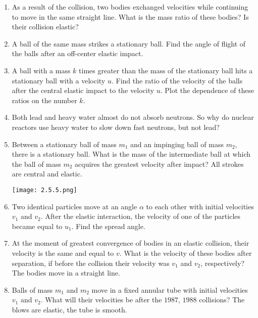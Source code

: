 \documentclass{article}
\begin{document}
\begin{enumerate}[label=2.5.\arabic*]

\item As a result of the collision, two bodies exchanged velocities while continuing to move in the same straight line. What is the mass ratio of these bodies? Is their collision elastic?

\item A ball of the same mass strikes a stationary ball. Find the angle of flight of the balls after an off-center elastic impact.

\item A ball with a mass $k$ times greater than the mass of the stationary ball hits a stationary ball with a velocity $u$. Find the ratio of the velocity of the balls after the central elastic impact to the velocity $u$. Plot the dependence of these ratios on the number $k$.

\item Both lead and heavy water almost do not absorb neutrons. So why do nuclear reactors use heavy water to slow down fast neutrons, but not lead?

\item Between a stationary ball of mass $m_1$ and an impinging ball of mass $m_2$, there is a stationary ball. What is the mass of the intermediate ball at which the ball of mass $m_2$ acquires the greatest velocity after impact? All strokes are central and elastic.

\begin{center}
    \texttt{[image: 2.5.5.png]}
\end{center}


\item Two identical particles move at an angle $\alpha$ to each other with initial velocities $v_1$ and $v_2$. After the elastic interaction, the velocity of one of the particles became equal to $u_1$. Find the spread angle.

\item At the moment of greatest convergence of bodies in an elastic collision, their velocity is the same and equal to $v$. What is the velocity of these bodies after separation, if before the collision their velocity was $v_1$ and $v_2$, respectively? The bodies move in a straight line.

\item Balls of mass $m_1$ and $m_2$ move in a fixed annular tube with initial velocities $v_1$ and $v_2$. What will their velocities be after the $1987$, $1988$ collisions? The blows are elastic, the tube is smooth.


\end{enumerate}
\end{document}
